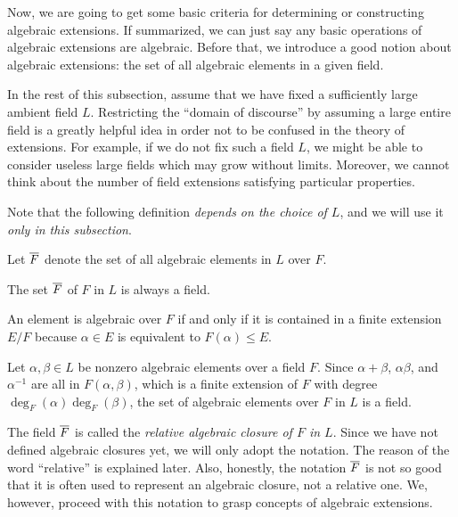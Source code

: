 \documentclass{../exp}
\begin{document}
Now, we are going to get some basic criteria for determining or constructing algebraic extensions.
If summarized, we can just say any basic operations of algebraic extensions are algebraic.
Before that, we introduce a good notion about algebraic extensions: the set of all algebraic elements in a given field.

In the rest of this subsection, assume that we have fixed a sufficiently large ambient field $L$.
Restricting the ``domain of discourse'' by assuming a large entire field is a greatly helpful idea in order not to be confused in the theory of extensions.
For example, if we do not fix such a field $L$, we might be able to consider useless large fields which may grow without limits.
Moreover, we cannot think about the number of field extensions satisfying particular properties.

Note that the following definition \emph{depends on the choice of $L$}, and we will use it \emph{only in this subsection}.
\begin{defn}
Let $\overline F$ denote the set of all algebraic elements in $L$ over $F$.
\end{defn}
\begin{prop}
The set $\overline F$ of $F$ in $L$ is always a field.
\end{prop}
\begin{pf}
An element is algebraic over $F$ if and only if it is contained in a finite extension $E/F$ because $\alpha\in E$ is equivalent to $F(\alpha)\le E$.

Let $\alpha,\beta\in L$ be nonzero algebraic elements over a field $F$.
Since $\alpha+\beta$, $\alpha\beta$, and $\alpha^{-1}$ are all in $F(\alpha,\beta)$, which is a finite extension of $F$ with degree $\deg_F(\alpha)\deg_F(\beta)$, the set of algebraic elements over $F$ in $L$ is a field.
\end{pf}
\begin{rmk}
The field $\overline F$ is called the \emph{relative algebraic closure of $F$ in $L$}.
Since we have not defined algebraic closures yet, we will only adopt the notation.
The reason of the word ``relative'' is explained later.
Also, honestly, the notation $\overline F$ is not so good that it is often used to represent an algebraic closure, not a relative one.
We, however, proceed with this notation to grasp concepts of algebraic extensions.
\end{rmk}
\end{document}
